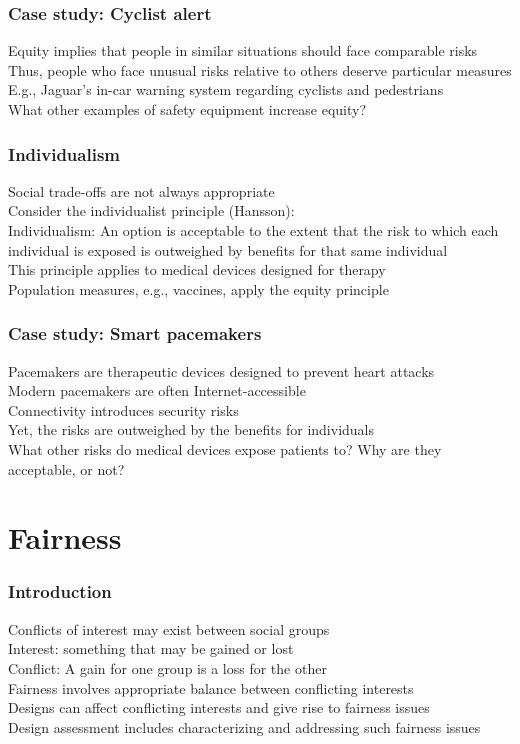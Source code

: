 \documentclass{article}
\begin{document}
\subsubsection*{Case study: Cyclist alert}
\label{ssub:case_study_cyclist_alert}


Equity implies that people in similar situations should face comparable risks\\
Thus, people who face unusual risks relative to others deserve particular measures\\
E.g., Jaguar’s in-car warning system regarding cyclists and pedestrians\\
What other examples of safety equipment increase equity?\\
\subsubsection*{Individualism}
\label{ssub:individualism}


Social trade-offs are not always appropriate\\
Consider the individualist principle (Hansson):\\
Individualism: An option is acceptable to the extent that the risk to which each individual is exposed is outweighed by benefits for that same individual\\
This principle applies to medical devices designed for therapy\\
{Population measures, e.g., vaccines, apply the equity principle}


\subsubsection*{Case study: Smart pacemakers}
Pacemakers are therapeutic devices designed to prevent heart attacks\\
Modern pacemakers are often Internet-accessible\\
Connectivity introduces security risks\\
Yet, the risks are outweighed by the benefits for individuals\\
What other risks do medical devices expose patients to? Why are they acceptable, or not?\\

\section*{Fairness}
\label{sec:fairness}
\subsubsection*{Introduction}
\label{ssub:introduction}
Conflicts of interest may exist between social groups\\
Interest: something that may be gained or lost\\
Conflict: A gain for one group is a loss for the other\\
Fairness involves appropriate balance between conflicting interests\\
Designs can affect conflicting interests and give rise to fairness issues\\
Design assessment includes characterizing and addressing such fairness issues\\
\end{document}
